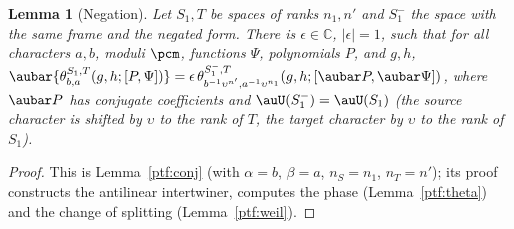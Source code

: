 \documentclass[10pt]{amsart}
\newtheorem{lemma}[theorem]{Lemma}
\theoremstyle{definition}
\theoremstyle{remark}
\newcommand{\C}{\mathbb C}
\begin{document}
\begin{lemma}[Negation]\label{pte:conj}
Let $S_1,T$ be spaces of ranks $n_1,n'$ and $S_1^-$ the space with the same frame and the negated form. There is
$\epsilon\in\C$, $|\epsilon|=1$, such that for all characters $a,b$, moduli $\pcm$, functions $\Psi$, polynomials $P$,
and $g,h$, $\aubar{\theta^{S_1,T}_{b,a}(g,h;[P,\Psi])}=\epsilon\,\theta^{S_1^-,T}_{b^{-1}\upsilon^{n'},a^{-1}\upsilon^{n_1}}
(g,h;[\aubar P,\aubar\Psi])$, where $\aubar P$ has conjugate coefficients and $\auU(S_1^-)=\auU(S_1)$ (the source
character is shifted by $\upsilon$ to the rank of $T$, the target character by $\upsilon$ to the rank of $S_1$).
\end{lemma}
\begin{proof}
This is Lemma~\ref{ptf:conj} (with $\alpha=b$, $\beta=a$, $n_S=n_1$, $n_T=n'$); its proof constructs the
antilinear intertwiner, computes the phase (Lemma~\ref{ptf:theta}) and the change of splitting
(Lemma~\ref{ptf:weil}).
\end{proof}
\end{document}
